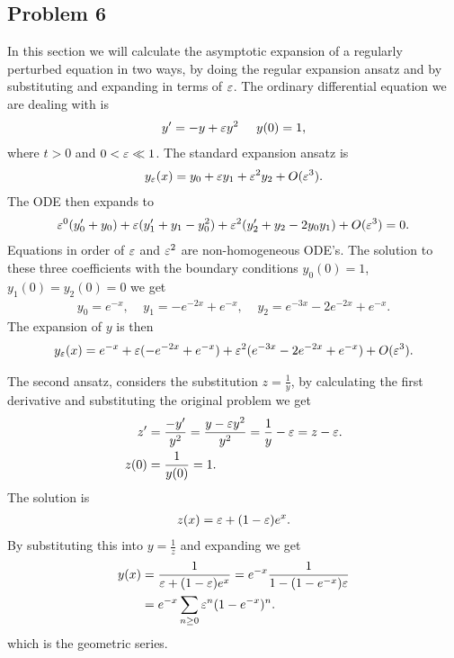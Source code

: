 \subsection{Problem 6}
In this section we will calculate the asymptotic expansion of a regularly
perturbed equation in two ways, by doing the regular expansion ansatz and by
substituting and expanding in terms of $\varepsilon$. The ordinary differential
equation we are dealing with is
\begin{align}
    y' = -y + \varepsilon y^2 \;\;\;\;\; y(0) = 1,
\end{align}
where $t > 0$ and $0 < \varepsilon \ll 1$. The standard expansion ansatz is
\begin{align}
y_\varepsilon(x) = y_0 + \varepsilon y_1 + \varepsilon^2 y_2 + O(\varepsilon^3).
\end{align}
The ODE then expands to
\begin{align}
    \varepsilon^0(y_0' + y_0) + \varepsilon(y_1' + y_1 - y_0^2) + \varepsilon^2(y_2' + y_2 -
    2y_0y_1) + O(\varepsilon^3) = 0.
\end{align}
Equations in order of $\varepsilon$ and $\varepsilon^2$ are non-homogeneous ODE's. The
solution to these three coefficients with the boundary conditions $y_0(0) =
1$, $y_1(0) =
y_2(0) = 0$ we get
\begin{align}
    y_0 = e^{-x}, \;\;\;\; y_1 = -e^{-2x} + e^{-x}, \;\;\;\; y_2 = e^{-3x} -
    2e^{-2x} + e^{-x}.
\end{align}
The expansion of $y$ is then
\begin{align}
    y_\varepsilon (x) = e^{-x} + \varepsilon(-e^{-2x} + e^{-x}) + \varepsilon^2(e^{-3x} - 2e^{-2x}
+ e^{-x}) + O(\varepsilon^3).  \end{align}

The second ansatz, considers the substitution $z = \frac{1}{y}$, by
calculating the first derivative and substituting the original problem we
get
\begin{align}
    z' &= \frac{-y'}{y^2} = \frac{y-\varepsilon y^2}{y^2} = \frac{1}{y} - \varepsilon = z -
    \varepsilon. \\
    z(0) &= \frac{1}{y(0)} = 1.
\end{align}
The solution is
\begin{align}
    z(x) = \varepsilon + (1-\varepsilon) e^x.
\end{align}
By substituting this into $y = \frac{1}{z}$ and expanding we get
\begin{align}
    y(x) &= \frac{1}{\varepsilon+(1-\varepsilon)e^x} = e^{-x} \frac{1}{1 - (1- e^{-x})\varepsilon}
    \\
         &= e^{-x} \sum_{n\geq 0} \varepsilon^n(1-e^{-x})^n.
\end{align}
which is the geometric series.

